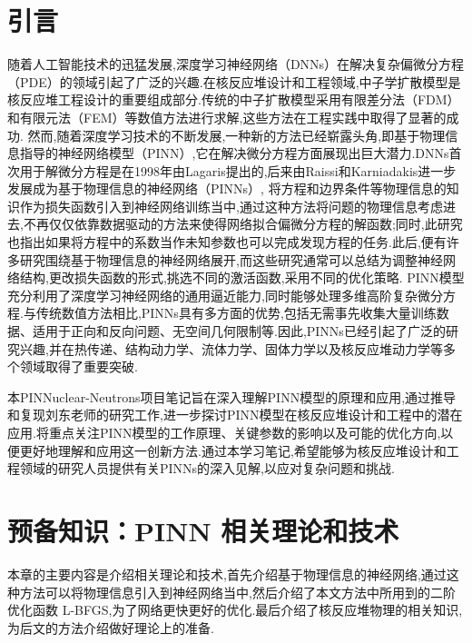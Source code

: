 \documentclass{Sichuan Normal University}
\begin{document}


\maketitle
\tableofcontents  %
\section*{引言}
随着人工智能技术的迅猛发展,深度学习神经网络（DNNs）在解决复杂偏微分方程（PDE）的领域引起了广泛的兴趣.在核反应堆设计和工程领域,中子学扩散模型是核反应堆工程设计的重要组成部分.传统的中子扩散模型采用有限差分法（FDM）和有限元法（FEM）等数值方法进行求解,这些方法在工程实践中取得了显著的成功.
然而,随着深度学习技术的不断发展,一种新的方法已经崭露头角,即基于物理信息指导的神经网络模型（PINN）,它在解决微分方程方面展现出巨大潜力.DNNs首次用于解微分方程是在1998年由Lagaris提出的\cite{lagarisArtificialNeuralNetworks1998},后来由Raissi和Karniadakis进一步发展成为基于物理信息的神经网络（PINNs）\cite{raissiPhysicsinformedNeuralNetworks2019},
将方程和边界条件等物理信息的知识作为损失函数引入到神经网络训练当中,通过这种方法将问题的物理信息考虑进去,不再仅仅依靠数据驱动的方法来使得网络拟合偏微分方程的解函数;同时,此研究也指出如果将方程中的系数当作未知参数也可以完成发现方程的任务.此后,便有许多研究围绕基于物理信息的神经网络展开,而这些研究通常可以总结为调整神经网络结构,更改损失函数的形式,挑选不同的激活函数,采用不同的优化策略.
PINN模型充分利用了深度学习神经网络的通用逼近能力,同时能够处理多维高阶复杂微分方程.与传统数值方法相比,PINNs具有多方面的优势,包括无需事先收集大量训练数据、适用于正向和反向问题、无空间几何限制等.因此,PINNs已经引起了广泛的研究兴趣,并在热传递、结构动力学、流体力学、固体力学以及核反应堆动力学等多个领域取得了重要突破.

本PINNuclear-Neutrons项目笔记旨在深入理解PINN模型的原理和应用,通过推导和复现刘东老师的研究工作\cite{LiuDongJiYuPINNShenDuJiQiXueXiJiShuQiuJieDuoWeiZhongZiXueKuoSanFangCheng2022},进一步探讨PINN模型在核反应堆设计和工程中的潜在应用.将重点关注PINN模型的工作原理、关键参数的影响以及可能的优化方向,以便更好地理解和应用这一创新方法.通过本学习笔记,希望能够为核反应堆设计和工程领域的研究人员提供有关PINNs的深入见解,以应对复杂问题和挑战.


\section{预备知识：PINN 相关理论和技术}
本章的主要内容是介绍相关理论和技术,首先介绍基于物理信息的神经网络,通过这种方法可以将物理信息引入到神经网络当中,然后介绍了本文方法中所用到的二阶优化函数 L-BFGS,为了网络更快更好的优化.最后介绍了核反应堆物理的相关知识,为后文的方法介绍做好理论上的准备.
\end{document}
